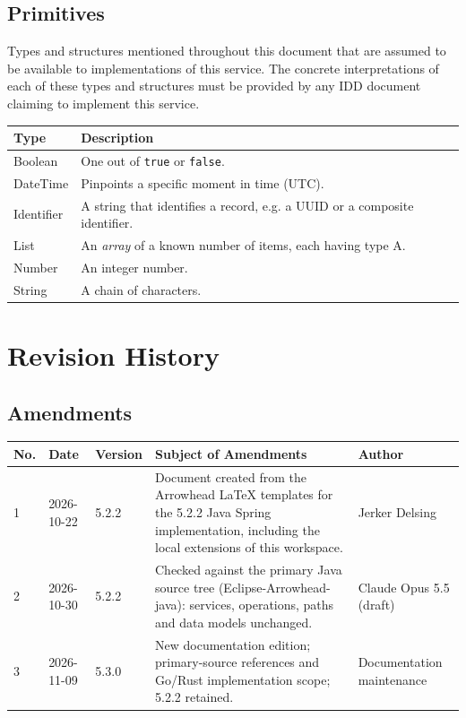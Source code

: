 \documentclass[a4paper]{arrowhead}
\newcommand{\pdef}[1]{{\textcolor{ArrowheadGrey}{#1\label{sec:model:primitives:#1}\label{sec:model:primitives:#1s}\label{sec:model:primitives:#1es}}}}
\begin{document}
\subsection{Primitives}
\label{sec:model:primitives}

Types and structures mentioned throughout this document that are assumed to be available to implementations of this service.
The concrete interpretations of each of these types and structures must be provided by any IDD document claiming to implement this service.

\noindent\begin{tabularx}{\textwidth}{| p{4.6cm} | X |} \hline
\rowcolor{gray!33} Type & Description \\ \hline
\pdef{Boolean} & One out of \texttt{true} or \texttt{false}. \\ \hline
\pdef{DateTime} & Pinpoints a specific moment in time (UTC). \\ \hline
\pdef{Identifier} & A string that identifies a record, e.g. a UUID or a composite identifier. \\ \hline
\pdef{List} & An \textit{array} of a known number of items, each having type A. \\ \hline
\pdef{Number} & An integer number. \\ \hline
\pdef{String} & A chain of characters. \\ \hline
\end{tabularx}

\newpage




\newpage

\section{Revision History}
\subsection{Amendments}

\noindent\begin{tabularx}{\textwidth}{| p{1cm} | p{3cm} | p{2cm} | X | p{4cm} |} \hline
\rowcolor{gray!33} No. & Date & Version & Subject of Amendments & Author \\ \hline

1 & 2026-10-22 & 5.2.2 & Document created from the Arrowhead LaTeX templates for the 5.2.2 Java Spring implementation, including the local extensions of this workspace. & Jerker Delsing \\ \hline
2 & 2026-10-30 & 5.2.2 & Checked against the primary Java source tree (Eclipse-Arrowhead-java): services, operations, paths and data models unchanged. & Claude Opus 5.5 (draft) \\ \hline
3 & 2026-11-09 & 5.3.0 & New documentation edition; primary-source references and Go/Rust implementation scope; 5.2.2 retained. & Documentation maintenance \\ \hline
\end{tabularx}
\end{document}
